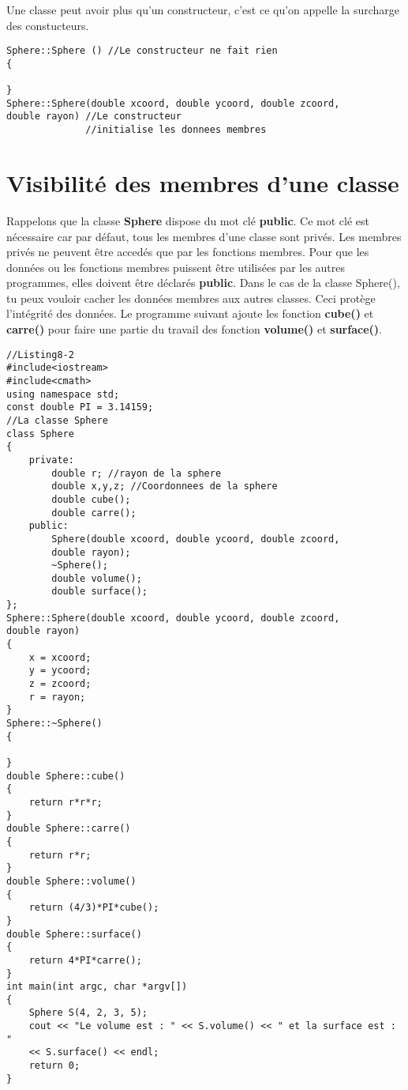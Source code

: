 \documentclass[a4paper, oneside,11pt]{book}
\begin{document}
Une classe peut avoir plus qu'un constructeur, c'est ce qu'on appelle la surcharge des constucteurs.

\begin{lstlisting}
Sphere::Sphere () //Le constructeur ne fait rien
{

}
Sphere::Sphere(double xcoord, double ycoord, double zcoord, 
double rayon) //Le constructeur
              //initialise les donnees membres
\end{lstlisting}

\section{Visibilit\'e des membres d'une classe}

Rappelons que la classe \textbf{Sphere} dispose du mot cl\'e \textbf{public}. Ce mot cl\'e est n\'ecessaire car par d\'efaut, tous les membres d'une classe sont priv\'es. Les 
membres priv\'es ne peuvent \^etre acced\'es que par les fonctions membres. Pour que les donn\'ees ou les fonctions membres puissent \^etre utilis\'ees par les autres programmes, elles
doivent \^etre d\'eclar\'es \textbf{public}.   Dans le cas de la classe Sphere(), tu peux  vouloir  cacher les donn\'ees membres aux autres classes. Ceci prot\`ege l'int\'egrit\'e
des donn\'ees. Le programme suivant ajoute les fonction \textbf{cube()} et \textbf{carre()} pour faire une partie du travail des fonction \textbf{volume()} et \textbf{surface()}.

\begin{lstlisting}
//Listing8-2
#include<iostream>
#include<cmath>
using namespace std;
const double PI = 3.14159;
//La classe Sphere
class Sphere
{
    private:
        double r; //rayon de la sphere
        double x,y,z; //Coordonnees de la sphere
        double cube();
        double carre();
    public:
        Sphere(double xcoord, double ycoord, double zcoord, 
        double rayon);
        ~Sphere();
        double volume();
        double surface();
};
Sphere::Sphere(double xcoord, double ycoord, double zcoord, 
double rayon)
{
    x = xcoord;
    y = ycoord;
    z = zcoord;
    r = rayon;
}
Sphere::~Sphere()
{

}
double Sphere::cube()
{
    return r*r*r;
}
double Sphere::carre()
{
    return r*r;
}
double Sphere::volume()
{
    return (4/3)*PI*cube();
}
double Sphere::surface()
{
    return 4*PI*carre();
}
int main(int argc, char *argv[])
{
    Sphere S(4, 2, 3, 5);
    cout << "Le volume est : " << S.volume() << " et la surface est : "
    << S.surface() << endl;
    return 0;
}
\end{lstlisting}
\end{document}
